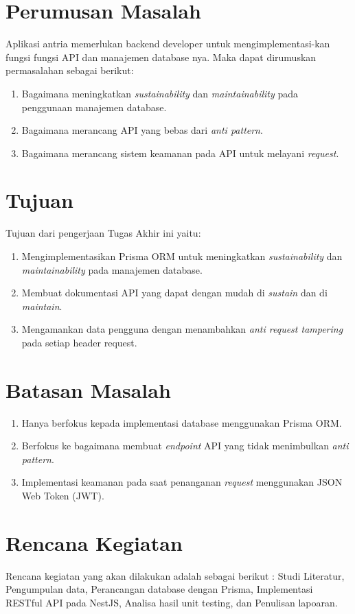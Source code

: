 \section{Perumusan Masalah}
Aplikasi antria memerlukan backend developer untuk mengimplementasi-kan fungsi fungsi API dan manajemen database nya. Maka dapat dirumuskan permasalahan sebagai berikut:
\begin{enumerate}
  \item Bagaimana meningkatkan \textit{sustainability} dan \textit{maintainability} pada penggunaan manajemen database.
  \item Bagaimana merancang API yang bebas dari \textit{anti pattern}.
  \item Bagaimana merancang sistem keamanan pada API untuk melayani \textit{request}.
\end{enumerate}


\section{Tujuan}
Tujuan dari pengerjaan Tugas Akhir ini yaitu:
\begin{enumerate}
  \item Mengimplementasikan Prisma ORM untuk meningkatkan \textit{sustainability} dan \textit{maintainability} pada manajemen database.
  \item Membuat dokumentasi API yang dapat dengan mudah di \textit{sustain} dan di \textit{maintain}.
  \item Mengamankan data pengguna dengan menambahkan \textit{anti request tampering} pada setiap header request.
  
\end{enumerate}

\section{Batasan Masalah}
\begin{enumerate}
  \item Hanya berfokus kepada implementasi database menggunakan Prisma ORM.
  \item Berfokus ke bagaimana membuat \textit{endpoint} API yang tidak menimbulkan \textit{anti pattern}.
  \item Implementasi keamanan pada saat penanganan \textit{request} menggunakan JSON Web Token (JWT).
\end{enumerate}

\section{Rencana Kegiatan}
Rencana kegiatan yang akan dilakukan adalah sebagai berikut : Studi Literatur, Pengumpulan data, Perancangan database dengan Prisma, Implementasi RESTful API pada NestJS, Analisa hasil unit testing, dan Penulisan lapoaran.
